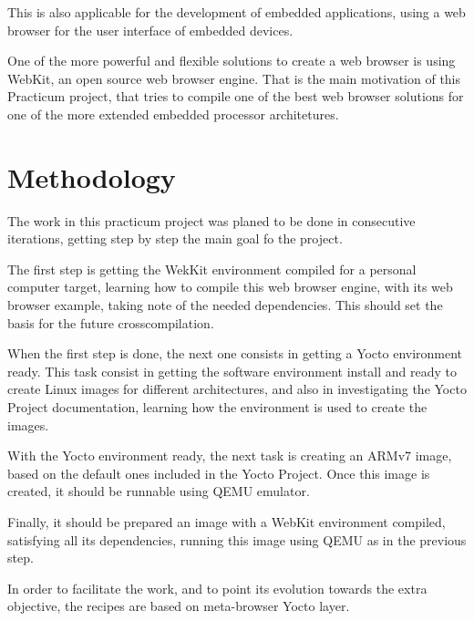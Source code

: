 \documentclass[a4paper,11pt,openany]{report}
\begin{document}
This is also applicable for the development of embedded applications, using a web browser for the user interface of embedded devices.

One of the more powerful and flexible solutions to create a web browser is using WebKit, an open source web browser engine. That is the main motivation of this Practicum project, that tries to compile one of the best web browser solutions for one of the more extended embedded processor architetures.

\section{Methodology}
The work in this practicum project was planed to be done in consecutive iterations, getting step by step the main goal fo the project.

The first step is getting the WekKit environment compiled for a personal computer target, learning how to compile this web browser engine, with its web browser example, taking note of the needed dependencies. This should set the basis for the future crosscompilation.

When the first step is done, the next one consists in getting a Yocto environment ready. This task consist in getting the software environment install and ready to create Linux images for different architectures, and also in investigating the Yocto Project documentation, learning how the environment is used to create the images.

With the Yocto environment ready, the next task is creating an ARMv7 image, based on the default ones included in the Yocto Project. Once this image is created, it should be runnable using QEMU emulator.

Finally, it should be prepared an image with a WebKit environment compiled, satisfying all its dependencies, running this image using QEMU as in the previous step.

In order to facilitate the work, and to point its evolution towards the extra objective, the recipes are based on meta-browser Yocto layer.
\end{document}
